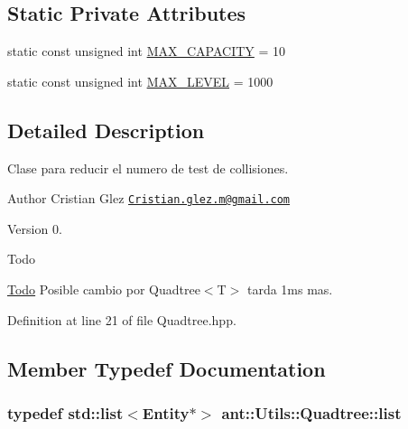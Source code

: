 \subsection*{Static Private Attributes}
\begin{DoxyCompactItemize}
\item 
static const unsigned int \hyperlink{classant_1_1_utils_1_1_quadtree_af040bf0509e7bf6cecd9b7d5c7cf5c0b}{M\+A\+X\+\_\+\+C\+A\+P\+A\+C\+I\+T\+Y} = 10
\item 
static const unsigned int \hyperlink{classant_1_1_utils_1_1_quadtree_a5c8873d75fa20002086f506ecfcf8354}{M\+A\+X\+\_\+\+L\+E\+V\+E\+L} = 1000
\end{DoxyCompactItemize}


\subsection{Detailed Description}
Clase para reducir el numero de test de collisiones. 

\begin{DoxyAuthor}{Author}
Cristian Glez \href{mailto:Cristian.glez.m@gmail.com}{\tt Cristian.\+glez.\+m@gmail.\+com} 
\end{DoxyAuthor}
\begin{DoxyVersion}{Version}
0. 
\end{DoxyVersion}
\begin{DoxyRefDesc}{Todo}
\item[\hyperlink{todo__todo000003}{Todo}]Posible cambio por Quadtree$<$\+T$>$ tarda 1ms mas. \end{DoxyRefDesc}


Definition at line 21 of file Quadtree.\+hpp.



\subsection{Member Typedef Documentation}
\hypertarget{classant_1_1_utils_1_1_quadtree_a744668597e9815bc6cdeb44a48f527dd}{
\subsubsection[{list}]{\setlength{\rightskip}{0pt plus 5cm}typedef std\+::list$<${\bf Entity}$\ast$$>$ {\bf ant\+::\+Utils\+::\+Quadtree\+::list}}}\label{classant_1_1_utils_1_1_quadtree_a744668597e9815bc6cdeb44a48f527dd}


